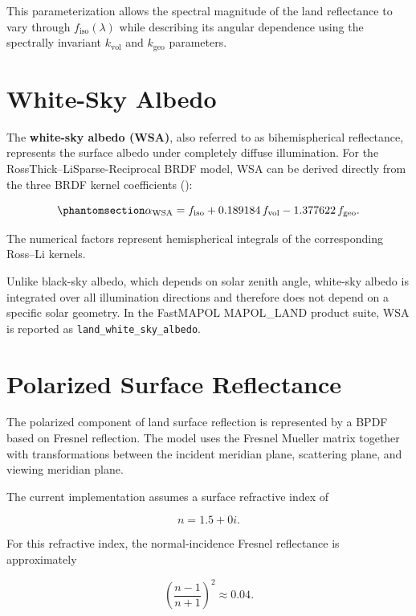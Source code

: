 \documentclass[
  11pt,
  letterpaper,
]{scrreprt}
\begin{document}
This parameterization allows the spectral magnitude of the land
reflectance to vary through \(f_{\mathrm{iso}}(\lambda)\) while
describing its angular dependence using the spectrally invariant
\(k_{\mathrm{vol}}\) and \(k_{\mathrm{geo}}\) parameters.

\section{White-Sky Albedo}\label{white-sky-albedo}

The \textbf{white-sky albedo (WSA)}, also referred to as bihemispherical
reflectance, represents the surface albedo under completely diffuse
illumination. For the RossThick--LiSparse-Reciprocal BRDF model, WSA can
be derived directly from the three BRDF kernel coefficients
():

\begin{equation}\phantomsection\label{eq-white-sky-albedo}{
\alpha_{\mathrm{WSA}}
=
f_{\mathrm{iso}}
+
0.189184\,f_{\mathrm{vol}}
-
1.377622\,f_{\mathrm{geo}}.
}\end{equation}

The numerical factors represent hemispherical integrals of the
corresponding Ross--Li kernels.

Unlike black-sky albedo, which depends on solar zenith angle, white-sky
albedo is integrated over all illumination directions and therefore does
not depend on a specific solar geometry. In the FastMAPOL MAPOL\_LAND
product suite, WSA is reported as \texttt{land\_white\_sky\_albedo}.

\section{Polarized Surface
Reflectance}\label{polarized-surface-reflectance}

The polarized component of land surface reflection is represented by a
BPDF based on Fresnel reflection. The model uses the Fresnel Mueller
matrix together with transformations between the incident meridian
plane, scattering plane, and viewing meridian plane.

The current implementation assumes a surface refractive index of

\[
n = 1.5 + 0i.
\]

For this refractive index, the normal-incidence Fresnel reflectance is
approximately

\[
\left(\frac{n-1}{n+1}\right)^2 \approx 0.04.
\]
\end{document}
